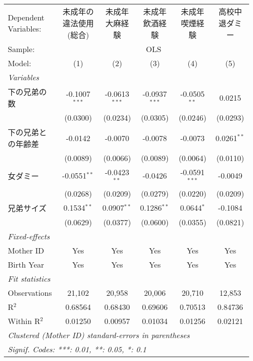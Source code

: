 \documentclass{article}
\begin{document}
\begin{landscape}


\begingroup
\centering
\begin{tabular}{lccccc}
   \tabularnewline \midrule \midrule
   Dependent Variables: & 未成年の違法使用(総合) & 未成年大麻経験  & 未成年飲酒経験  & 未成年喫煙経験  & 高校中退ダミー\\  
   Sample: & \multicolumn{5}{c}{OLS} \\ 
   Model:               & (1)                    & (2)             & (3)             & (4)             & (5)\\  
   \midrule
   \emph{Variables}\\
   下の兄弟の数         & -0.1007$^{***}$        & -0.0613$^{***}$ & -0.0937$^{***}$ & -0.0505$^{**}$  & 0.0215\\   
                        & (0.0300)               & (0.0234)        & (0.0305)        & (0.0246)        & (0.0293)\\   
   下の兄弟との年齢差   & -0.0142                & -0.0070         & -0.0078         & -0.0073         & 0.0261$^{**}$\\   
                        & (0.0089)               & (0.0066)        & (0.0089)        & (0.0064)        & (0.0110)\\   
   女ダミー             & -0.0551$^{**}$         & -0.0423$^{**}$  & -0.0426         & -0.0591$^{***}$ & -0.0049\\   
                        & (0.0268)               & (0.0209)        & (0.0279)        & (0.0220)        & (0.0209)\\   
   兄弟サイズ           & 0.1534$^{**}$          & 0.0907$^{**}$   & 0.1286$^{**}$   & 0.0644$^{*}$    & -0.1084\\   
                        & (0.0629)               & (0.0377)        & (0.0600)        & (0.0355)        & (0.0821)\\   
   \midrule
   \emph{Fixed-effects}\\
   Mother ID            & Yes                    & Yes             & Yes             & Yes             & Yes\\  
   Birth Year           & Yes                    & Yes             & Yes             & Yes             & Yes\\  
   \midrule
   \emph{Fit statistics}\\
   Observations         & 21,102                 & 20,958          & 20,006          & 20,710          & 12,853\\  
   R$^2$                & 0.68564                & 0.68430         & 0.69606         & 0.70513         & 0.84736\\  
   Within R$^2$         & 0.01250                & 0.00957         & 0.01034         & 0.01256         & 0.02121\\  
   \midrule \midrule
   \multicolumn{6}{l}{\emph{Clustered (Mother ID) standard-errors in parentheses}}\\
   \multicolumn{6}{l}{\emph{Signif. Codes: ***: 0.01, **: 0.05, *: 0.1}}\\
\end{tabular}
\par\endgroup


\end{landscape}
\end{document}
